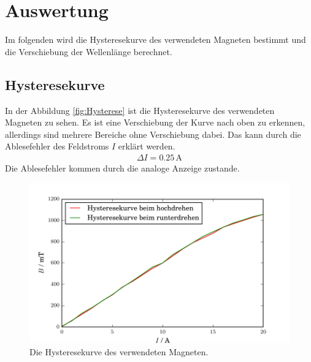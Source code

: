\newpage
\section{Auswertung}
\label{sec:Auswertung}
Im folgenden wird die Hysteresekurve des verwendeten Magneten bestimmt und die Verschiebung der Wellenlänge berechnet.

\subsection{Hysteresekurve}
In der Abbildung \eqref{fig:Hysterese} ist die Hysteresekurve des verwendeten Magneten zu sehen. Es ist eine Verschiebung der Kurve nach oben zu erkennen, allerdings sind mehrere Bereiche ohne Verschiebung dabei. Das kann durch die Ablesefehler des Feldstroms $I$ erklärt werden.
\begin{align*}
  \Delta I = 0.25\, \text{A}
\end{align*}
Die Ablesefehler kommen durch die analoge Anzeige zustande.

\begin{figure}[H]
  \centering
  \includegraphics[width=\linewidth]{Bilder/Hysterese.pdf}
  \caption{Die Hysteresekurve des verwendeten Magneten.}
  \label{fig:Hysterese}
\end{figure}

